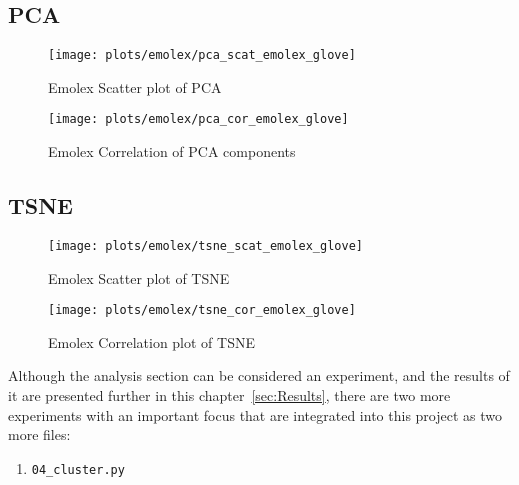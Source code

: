 \subsection{PCA}

\begin{figure}[H]
  \texttt{[image: plots/emolex/pca\_scat\_emolex\_glove]}
  \centering
  \caption{Emolex Scatter plot of PCA}
\end{figure}\label{fig:pca_scat_emolex_glove}

\begin{figure}[H]
  \texttt{[image: plots/emolex/pca\_cor\_emolex\_glove]}
  \centering
  \caption{Emolex Correlation of PCA components}
\end{figure}\label{fig:pca_cor_emolex_glove}

\subsection{TSNE}

\begin{figure}[H]
  \texttt{[image: plots/emolex/tsne\_scat\_emolex\_glove]}
  \centering
  \caption{Emolex Scatter plot of TSNE}
\end{figure}\label{fig:tsne_scat_emolex_glove}

\begin{figure}[H]
  \texttt{[image: plots/emolex/tsne\_cor\_emolex\_glove]}
  \centering
  \caption{Emolex Correlation plot of TSNE}
\end{figure}\label{fig:tsne_cor_emolex_glove}






























Although the analysis section can be considered an experiment, and the results of it are presented further in this chapter~\ref{sec:Results}, there are two more experiments with an important focus that are integrated into this project as two more files:

\begin{enumerate}
  \item \lstinline{04_cluster.py}
\end{enumerate}

